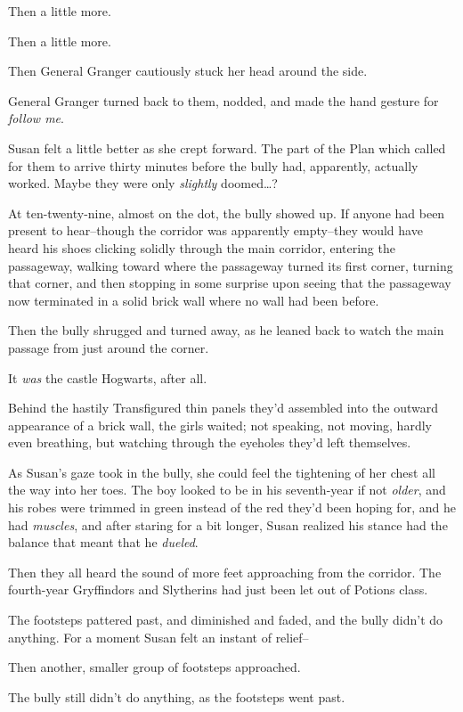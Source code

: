 Then a little more.

Then a little more.

Then General Granger cautiously stuck her head around the side.

General Granger turned back to them, nodded, and made the hand gesture for \emph{follow me}.

Susan felt a little better as she crept forward. The part of the Plan which called for them to arrive thirty minutes before the bully had, apparently, actually worked. Maybe they were only \emph{slightly} doomed{\ldots}?

\later

At ten-twenty-nine, almost on the dot, the bully showed up. If anyone had been present to hear\---though the corridor was apparently empty\---they would have heard his shoes clicking solidly through the main corridor, entering the passageway, walking toward where the passageway turned its first corner, turning that corner, and then stopping in some surprise upon seeing that the passageway now terminated in a solid brick wall where no wall had been before.

Then the bully shrugged and turned away, as he leaned back to watch the main passage from just around the corner.

It \emph{was} the castle Hogwarts, after all.

Behind the hastily Transfigured thin panels they'd assembled into the outward appearance of a brick wall, the girls waited; not speaking, not moving, hardly even breathing, but watching through the eyeholes they'd left themselves.

As Susan's gaze took in the bully, she could feel the tightening of her chest all the way into her toes. The boy looked to be in his seventh-year if not \emph{older}, and his robes were trimmed in green instead of the red they'd been hoping for, and he had \emph{muscles}, and after staring for a bit longer, Susan realized his stance had the balance that meant that he \emph{dueled}.

Then they all heard the sound of more feet approaching from the corridor. The fourth-year Gryffindors and Slytherins had just been let out of Potions class.

The footsteps pattered past, and diminished and faded, and the bully didn't do anything. For a moment Susan felt an instant of relief\---

Then another, smaller group of footsteps approached.

The bully still didn't do anything, as the footsteps went past.

